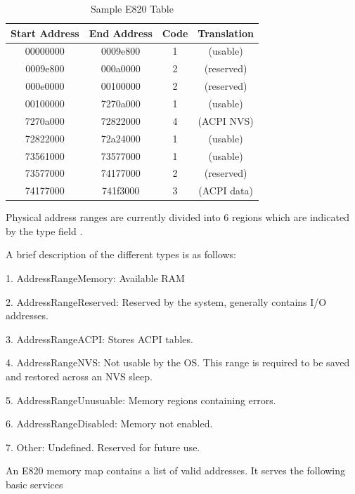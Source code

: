 \setlength{\belowcaptionskip}{-10pt}

\begin{table}[H]
  \centering
  \caption{Sample E820 Table}
  \label{tab:e820table}
  \begin{tabular}{|c|c|c|c|}
      \hline
      Start Address & End Address & Code & Translation \\
      \hline 
      \hline
      00000000 & 0009e800 & 1 & (usable) \\
      \hline 
      0009e800 & 000a0000 & 2 & (reserved) \\
      \hline 
      000e0000 & 00100000 & 2 & (reserved) \\
      \hline 
      00100000 & 7270a000 & 1 & (usable) \\
      \hline 
      7270a000 & 72822000 & 4 & (ACPI NVS) \\
      \hline 
      72822000 & 72a24000 & 1 & (usable) \\
      \hline 
      73561000 & 73577000 & 1 & (usable) \\
      \hline 
      73577000 & 74177000 & 2 & (reserved) \\
      \hline
      74177000 & 741f3000 & 3 & (ACPI data)  \\
      \hline
  \end{tabular}
\end{table}



Physical address ranges are currently divided into 6 regions which are indicated by the type field \cite{acpi_manual}.

A brief description of the different types is as follows:

1. AddressRangeMemory: Available RAM

2. AddressRangeReserved: Reserved by the system, generally contains I/O addresses.

3. AddressRangeACPI: Stores ACPI tables.

4. AddressRangeNVS: Not usable by the OS. This range is required to be saved and restored across an NVS sleep.

5. AddressRangeUnusuable: Memory regions containing errors.

6. AddressRangeDisabled: Memory not enabled.

7. Other: Undefined. Reserved for future use.

An E820 memory map contains a list of valid addresses. It serves the following basic services

